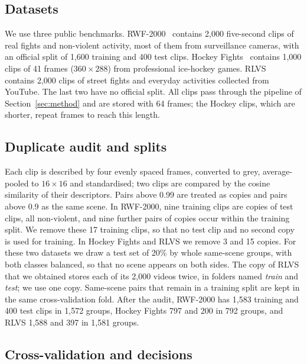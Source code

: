 \documentclass[conference]{IEEEtran}
\begin{document}
\subsection{Datasets}

We use three public benchmarks.
RWF-2000~\cite{rwf2000} contains 2{,}000 five-second clips of real fights
and non-violent activity, most of them from surveillance cameras, with an
official split of 1{,}600 training and 400 test clips. Hockey
Fights~\cite{hockey} contains 1{,}000 clips of 41 frames ($360\times288$)
from professional ice-hockey games. RLVS~\cite{rlvs} contains 2{,}000 clips
of street fights and everyday activities collected from YouTube. The last
two have no official split. All clips pass through the pipeline of
Section~\ref{sec:method} and are stored with 64 frames; the Hockey clips,
which are shorter, repeat frames to reach this length.

\subsection{Duplicate audit and splits}

Each clip is described by four evenly spaced frames, converted to grey,
average-pooled to $16\times16$ and standardised; two clips are compared by
the cosine similarity of their descriptors. Pairs above 0.99 are treated as
copies and pairs above 0.9 as the same scene. In RWF-2000, nine training
clips are copies of test clips, all non-violent, and nine further pairs of
copies occur within the training split. We remove these 17 training clips,
so that no test clip and no second copy is used for training. In Hockey
Fights and RLVS we remove 3 and 15 copies. For these two datasets we draw a
test set of 20\% by whole same-scene groups, with both classes balanced,
so that no scene appears on both sides. The copy of RLVS that we obtained
stores each of its 2{,}000 videos twice, in folders named \emph{train} and
\emph{test}; we use one copy. Same-scene pairs that remain in a training split are kept in the same
cross-validation fold. After the audit, RWF-2000 has 1{,}583 training and
400 test clips in 1{,}572 groups, Hockey Fights 797 and 200 in 792 groups,
and RLVS 1{,}588 and 397 in 1{,}581 groups.


\subsection{Cross-validation and decisions}
\end{document}
